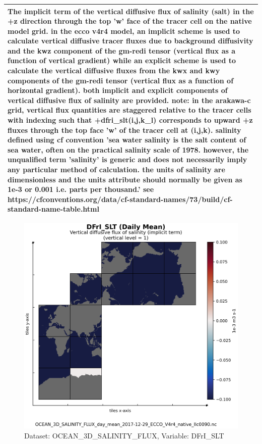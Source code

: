 \begin{longtable}{|m{}|m{}|m{}|m{}|}
\multicolumn{4}{|p{1\textwidth}|}{\footnotesize{{The implicit term of the vertical diffusive flux of salinity (salt) in the +z direction through the top 'w' face of the tracer cell on the native model grid. in the ecco v4r4 model, an implicit scheme is used to calculate vertical diffusive tracer fluxes due to background diffusivity and the kwz component of the gm-redi tensor (vertical flux as a function of vertical gradient) while an explicit scheme is used to calculate the vertical diffusive fluxes from the kwx and kwy components of the gm-redi tensor (vertical flux as a function of horizontal gradient). both implicit and explicit components of vertical diffusive flux of salinity are provided. note: in the arakawa-c grid, vertical flux quantities are staggered relative to the tracer cells with indexing such that +dfri\_slt(i,j,k\_l) corresponds to upward +z fluxes through the top face 'w' of the tracer cell at (i,j,k). salinity defined using cf convention 'sea water salinity is the salt content of sea water, often on the practical salinity scale of 1978. however, the unqualified term 'salinity' is generic and does not necessarily imply any particular method of calculation. the units of salinity are dimensionless and the units attribute should normally be given as 1e-3 or 0.001 i.e. parts per thousand.' see https://cfconventions.org/data/cf-standard-names/73/build/cf-standard-name-table.html}}} \\ \hline
\end{longtable}

\begin{figure}[H]
\centering
\includegraphics[scale=0.55]{../images/plots/v4r4/native_plots/Ocean_Three-Dimensional_Salinity_Fluxes/DFrI_SLT.png}
\caption{Dataset: OCEAN\_3D\_SALINITY\_FLUX, Variable: DFrI\_SLT}
\label{tab:table-OCEAN_3D_SALINITY_FLUX_DFrI_SLT-Plot}
\end{figure}
\newpage
\pagebreak
